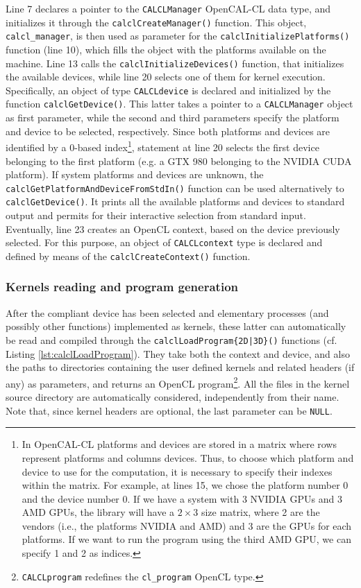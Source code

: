 Line 7 declares a pointer to the \verb'CALCLManager' OpenCAL-CL data
type, and initializes it through the \verb'calclCreateManager()'
function. This object, \verb'calcl_manager', is then used as parameter
for the \verb'calclInitializePlatforms()' function (line 10), which
fills the object with the platforms available on the machine. Line 13
calls the \verb'calclInitializeDevices()' function, that initializes
the available devices, while line 20 selects one of them for kernel
execution. Specifically, an object of type \verb'CALCLdevice' is
declared and initialized by the function \verb'calclGetDevice()'. This
latter takes a pointer to a \verb'CALCLManager' object as first
parameter, while the second and third parameters specify the platform
and device to be selected, respectively. Since both platforms and
devices are identified by a 0-based index\footnote{In OpenCAL-CL
  platforms and devices are stored in a matrix where rows represent
  platforms and columns devices. Thus, to choose which platform and
  device to use for the computation, it is necessary to specify their
  indexes within the matrix. For example, at lines 15, we chose the
  platform number 0 and the device number 0. If we have a system with
  3 NVIDIA GPUs and 3 AMD GPUs, the library will have a $2 \times 3$
  size matrix, where 2 are the vendors (i.e., the platforms NVIDIA and
  AMD) and 3 are the GPUs for each platforms. If we want to run the
  program using the third AMD GPU, we can specify 1 and 2 as
  indices.}, statement at line 20 selects the first device belonging
to the first platform (e.g. a GTX 980 belonging to the NVIDIA CUDA
platform). If system platforms and devices are unknown, the
\verb'calclGetPlatformAndDeviceFromStdIn()' function can be used
alternatively to \verb'calclGetDevice()'. It prints all the available
platforms and devices to standard output and permits for their
interactive selection from standard input. Eventually, line 23 creates
an OpenCL context, based on the device previously selected. For this
purpose, an object of \verb'CALCLcontext' type is declared and defined
by means of the \verb'calclCreateContext()' function.

\subsubsection{Kernels reading and program generation}

After the compliant device has been selected and elementary processes
(and possibly other functions) implemented as kernels, these latter
can automatically be read and compiled through the
\verb'calclLoadProgram{2D|3D}()' functions (cf. Listing
\ref{lst:calclLoadProgram}). They take both the context and device,
and also the paths to directories containing the user defined kernels
and related headers (if any) as parameters, and returns an OpenCL
program\footnote{\texttt{CALCLprogram} redefines the
  \texttt{cl\_program} OpenCL type.}. All the files in the kernel
source directory are automatically considered, independently from
their name. Note that, since kernel headers are optional, the last
parameter can be \verb'NULL'.

